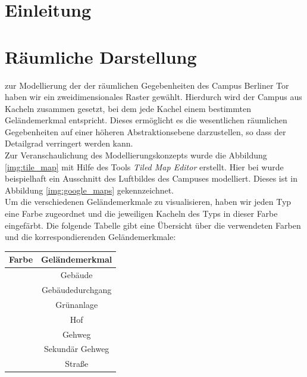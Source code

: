 \documentclass[10pt]{scrartcl}
\author{André Harms, Oliver Steenbuck, Armin Steudte  \\ Carsten Noetzel, Dennis Blauhut, Torben Becker}
\title{\titletext}
\date{26.10.2011}
\begin{document}
\maketitle

\setcounter{tocdepth}{3}
\tableofcontents
\listoffigures

\section{Einleitung}

\section{Räumliche Darstellung}
zur Modellierung der der räumlichen Gegebenheiten des Campus Berliner Tor haben wir ein zweidimensionales Raster gewählt.
Hierdurch wird der Campus aus Kacheln zusammen gesetzt, bei dem jede Kachel einem bestimmten Geländemerkmal entspricht.
Dieses ermöglicht es die wesentlichen räumlichen Gegebenheiten auf einer höheren Abstraktionsebene darzustellen, so dass der Detailgrad verringert werden kann.\\
Zur Veranschaulichung des Modellierungskonzepts wurde die Abbildung \ref{img:tile_map} mit Hilfe des Tools \textit{Tiled Map Editor} erstellt. Hier bei wurde beispielhaft ein Ausschnitt des Luftbildes des Campuses modelliert.
Dieses ist in Abbildung \ref{img:google_maps} gekennzeichnet.\\
Um die verschiedenen Geländemerkmale zu visualisieren, haben wir jeden Typ eine Farbe zugeordnet und die jeweiligen Kacheln des Typs in dieser Farbe eingefärbt. Die folgende Tabelle gibt eine Übersicht über die verwendeten Farben und die korrespondierenden Geländemerkmale:


\begin{tabular}{|c|c|}
\hline 
\textbf{Farbe} & \textbf{Geländemerkmal} \\ 
\hline 
\cellcolor{gebaude} & Gebäude \\
\hline 
\cellcolor{gebaude_durchgang} & Gebäudedurchgang\\
\hline 
\cellcolor{gruenanlage} &  Grünanlage\\ 
\hline 
\cellcolor{hof} &  Hof\\ 
\hline 
\cellcolor{gehweg} & Gehweg\\ 
\hline 
\cellcolor{gehweg_sek} & Sekundär Gehweg\\
\hline 
\cellcolor{strasse} & Straße\\ 
\hline 
\end{tabular} 
\end{document}

